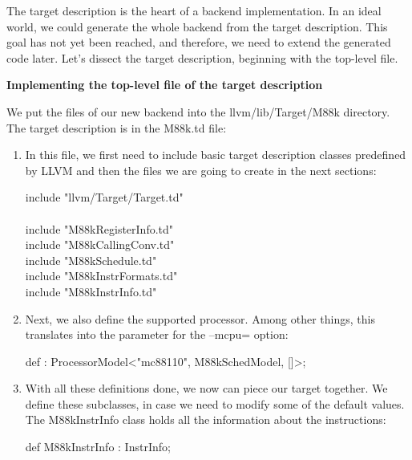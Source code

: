 
The target description is the heart of a backend implementation. In an ideal world, we could generate the whole backend from the target description. This goal has not yet been reached, and therefore, we need to extend the generated code later. Let's dissect the target description, beginning with the top-level file.\par

\hspace*{\fill} \par %
\textbf{Implementing the top-level file of the target description}

We put the files of our new backend into the llvm/lib/Target/M88k directory. The target description is in the M88k.td file:\par

\begin{enumerate}
\item In this file, we first need to include basic target description classes predefined by LLVM and then the files we are going to create in the next sections:
\begin{tcolorbox}[colback=white,colframe=black]
include "llvm/Target/Target.td" \\
\\
include "M88kRegisterInfo.td" \\
include "M88kCallingConv.td" \\
include "M88kSchedule.td" \\
include "M88kInstrFormats.td" \\
include "M88kInstrInfo.td"
\end{tcolorbox}

\item Next, we also define the supported processor. Among other things, this translates into the parameter for the –mcpu= option:
\begin{tcolorbox}[colback=white,colframe=black]
def : ProcessorModel<"mc88110", M88kSchedModel, []>;
\end{tcolorbox}

\item With all these definitions done, we now can piece our target together. We define these subclasses, in case we need to modify some of the default values. The M88kInstrInfo class holds all the information about the instructions:
\begin{tcolorbox}[colback=white,colframe=black]
def M88kInstrInfo : InstrInfo;
\end{tcolorbox}


\end{enumerate}
